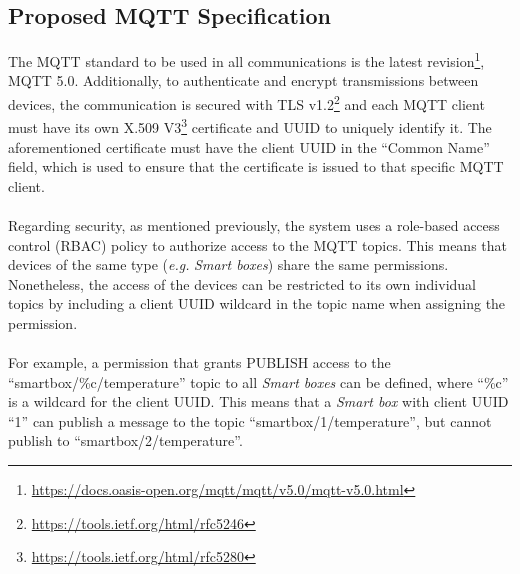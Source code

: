 \subsection{Proposed \acs{MQTT} Specification}

The \acs{MQTT} standard to be used in all communications is the latest revision\footnote{\url{https://docs.oasis-open.org/mqtt/mqtt/v5.0/mqtt-v5.0.html}}, MQTT 5.0. Additionally, to authenticate and encrypt transmissions between devices, the communication is secured with \acs{TLS} v1.2\footnote{\url{https://tools.ietf.org/html/rfc5246}} and each \acs{MQTT} client must have its own X.509 V3\footnote{\url{https://tools.ietf.org/html/rfc5280}} certificate and \acs{UUID} to uniquely identify it. 
The aforementioned certificate must have the client \acs{UUID} in the ``Common Name'' field, which is used to ensure that the certificate is issued to that specific \acs{MQTT} client.

\paragraph{} Regarding security, as mentioned previously, the system uses a role-based access control (\acs{RBAC}) policy to authorize access to the \acs{MQTT} topics. This means that devices of the same type (\textit{e.g.} \textit{Smart boxes}) share the same permissions. 
Nonetheless, the access of the devices can be restricted to its own individual topics by including a client \acs{UUID} wildcard in the topic name when assigning the permission.


\paragraph{} For example, a permission that grants PUBLISH access to the ``smartbox/\%c/temperature'' topic to all \textit{Smart boxes} can be defined, where ``\%c'' is a wildcard for the client \acs{UUID}. This means that a \textit{Smart box} with client \acs{UUID} ``1'' can publish a message to the topic ``smartbox/1/temperature'', but cannot publish to ``smartbox/2/temperature''.

